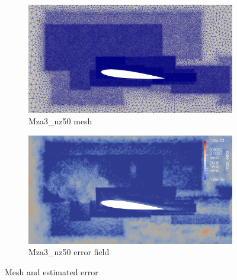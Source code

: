 \begin{figure}[H]
\begin{subfigure}[b]{0.475\textwidth}
	\centering
	\includegraphics[width=1\textwidth]{figures/zonal_adapt_results/Mesh_and_error_plots/Mza3_inplane.png}
	\caption{Mza3\_nz50 mesh}
	\label{fig:zonal_Mza3_mesh}
\end{subfigure}
\begin{subfigure}[b]{0.475\textwidth}
	\centering
	\includegraphics[width=1\textwidth]{figures/zonal_adapt_results/Mesh_and_error_plots/Mza3_error.png}
	\caption{Mza3\_nz50 error field}
	\label{fig:zonal_Mza3_error}
\end{subfigure}
\caption{Mesh and estimated error}
\label{fig:Re40k_meshes}
\end{figure}